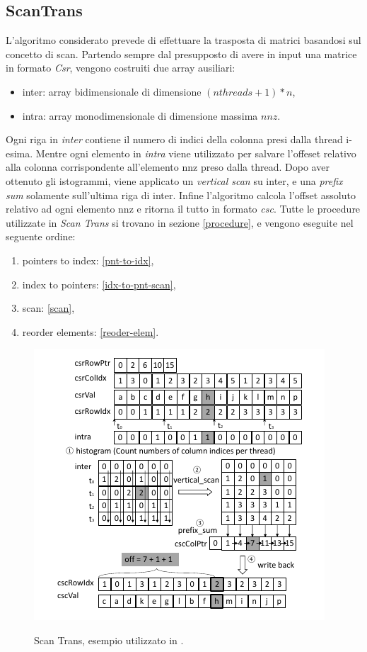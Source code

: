 \documentclass[]{IEEEtran}
\begin{document}
	\subsection{ScanTrans}
	L'algoritmo considerato prevede di effettuare la trasposta di matrici basandosi sul concetto di scan. Partendo sempre dal presupposto di avere in input una matrice in formato \textit{Csr}, vengono costruiti due array ausiliari:
	\begin{itemize}
		\item inter: array bidimensionale di dimensione $ (nthreads+1) * n $,
		\item intra: array monodimensionale di dimensione massima $ nnz $.
	\end{itemize}
	Ogni riga in \textit{inter} contiene il numero di indici della colonna presi dalla thread i-esima. Mentre ogni elemento in \textit{intra} viene utilizzato per salvare l'offeset relativo alla colonna corrispondente all'elemento nnz preso dalla thread. Dopo aver ottenuto gli istogrammi, viene applicato un \textit{vertical scan} su inter, e una \textit{prefix sum} solamente sull'ultima riga di inter. Infine l'algoritmo calcola l'offset assoluto relativo ad ogni elemento nnz e ritorna il tutto in formato \textit{csc}.\newline
	Tutte le procedure utilizzate in \textit{Scan Trans} si trovano in sezione \ref{procedure}, e vengono eseguite nel seguente ordine:
	\begin{enumerate}
		\item pointers to index: \ref{pnt-to-idx},
		\item index to pointers: \ref{idx-to-pnt-scan},
		\item scan: \ref{scan},
		\item reorder elements: \ref{reoder-elem}.
	\end{enumerate}
	
	\begin{figure}[h!]
		\includegraphics[scale=0.8]{scantrans.png}
		\label{scantrans}
		\caption{Scan Trans, esempio utilizzato in \cite{parallelTrans}.}
	\end{figure}
	
\end{document}
